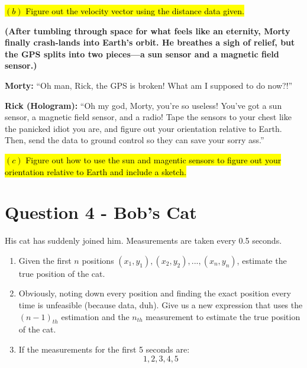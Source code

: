 \documentclass[a4paper, 12pt]{exam}
\begin{document}
\hl{$(b)$ Figure out the velocity vector using the distance data given.} \bigskip

\noindent \textbf{(After tumbling through space for what feels like an eternity, Morty finally crash-lands into Earth’s orbit. He breathes a sigh of relief, but the GPS splits into two pieces—a sun sensor and a magnetic field sensor.)} \bigskip

\noindent \textbf{Morty:} “Oh man, Rick, the GPS is broken! What am I supposed to do now?!” \bigskip

\noindent \textbf{Rick (Hologram):} “Oh my god, Morty, you’re so useless! You’ve got a sun sensor, a magnetic field sensor, and a radio! Tape the sensors to your chest like the panicked idiot you are, and figure out your orientation relative to Earth. Then, send the data to ground control so they can save your sorry ass.”

\bigskip

\hl{$(c)$ Figure out how to use the sun and magentic sensors to figure out your orientation relative to Earth and include a sketch.} \bigskip
	
	
	\pagebreak
	\section*{Question 4 - Bob's Cat}
	His cat has suddenly joined him. Measurements are taken every 0.5 seconds.
	\begin{enumerate}[label = (\alph*)]
		\item Given the first $n$ positions ${(x_1, y_1), (x_2, y_2), ... , (x_n, y_n)}$, estimate the true position of the cat.
		\item Obviously, noting down every position and finding the exact position every time is unfeasible (because data, duh). Give us a new expression that uses the $(n-1)_{th}$ estimation and the $n_{th}$ measurement to estimate the true position of the cat.
		\item If the measurements for the first 5 seconds are:
		\begin{equation*}
			1,2,3,4,5
		\end{equation*}
	\end{enumerate}

\end{document}
